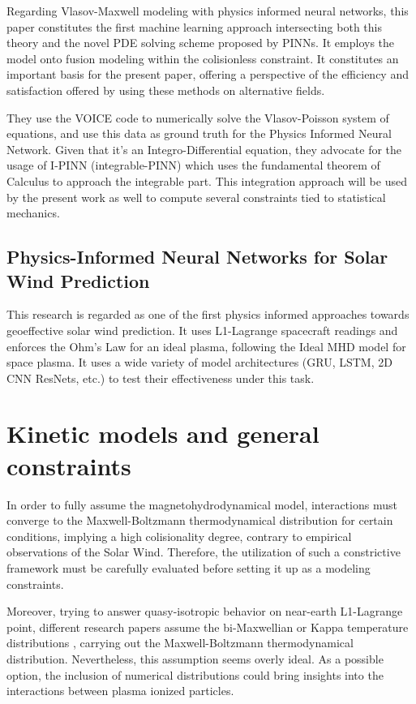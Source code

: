 \documentclass[12pt]{article}
\begin{document}
Regarding Vlasov-Maxwell modeling with physics informed neural networks, this paper constitutes the first machine learning approach intersecting both this theory and the novel PDE solving scheme proposed by PINNs. \cite{kumar2023physicsinformedneuralnetworks} It employs the model onto fusion modeling within the colisionless constraint. It constitutes an important basis for the present paper, offering a perspective of the efficiency and satisfaction offered by using these methods on alternative fields.

They use the VOICE code to numerically solve the Vlasov-Poisson system of equations, and use this data as ground truth for the Physics Informed Neural Network. Given that it's an Integro-Differential equation, they advocate for the usage of I-PINN (integrable-PINN) \cite{} which uses the fundamental theorem of Calculus to approach the integrable part. This integration approach will be used by the present work as well to compute several constraints tied to statistical mechanics.

\subsection{Physics-Informed Neural Networks for Solar Wind Prediction}

This research \cite{johnson2022physics} is regarded as one of the first physics informed approaches towards geoeffective solar wind prediction. It uses L1-Lagrange spacecraft readings and enforces the Ohm's Law for an ideal plasma, following the Ideal MHD model for space plasma. It uses a wide variety of model architectures (GRU, LSTM, 2D CNN ResNets, etc.) to test their effectiveness under this task.

\section{Kinetic models and general constraints}
In order to fully assume the magnetohydrodynamical model, interactions must converge to the Maxwell-Boltzmann thermodynamical distribution for certain conditions, implying a high colisionality degree, contrary to empirical observations of the Solar Wind. Therefore, the utilization of such a constrictive framework must be carefully evaluated before setting it up as a modeling constraints.

Moreover, trying to answer quasy-isotropic behavior on near-earth L1-Lagrange point, different research papers assume the bi-Maxwellian or Kappa temperature distributions \cite{Stansby_2018, Nicolaou_2018, Zouganelis_2004}, carrying out the Maxwell-Boltzmann thermodynamical distribution. Nevertheless, this assumption seems overly ideal. As a possible option, the inclusion of numerical distributions could bring insights into the interactions between plasma ionized particles.
\end{document}
